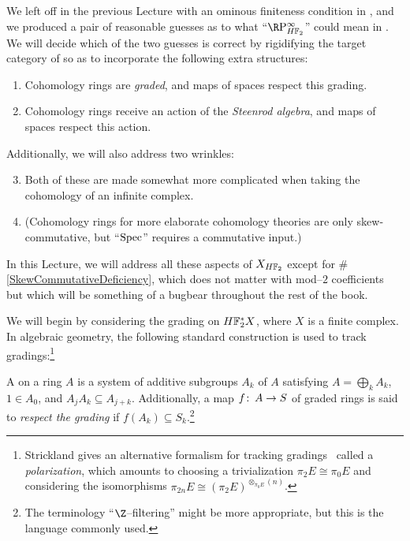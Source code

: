 We left off in the previous Lecture with an ominous finiteness condition in , and we produced a pair of reasonable guesses as to what ``\(\RP^\infty_{\HFtwo}\)'' could mean in .  We will decide which of the two guesses is correct by rigidifying the target category of  so as to incorporate the following extra structures:
\begin{enumerate}
\item Cohomology rings are \emph{graded}, and maps of spaces respect this grading.
\item Cohomology rings receive an action of the \emph{Steenrod algebra}, and maps of spaces respect this action.
\end{enumerate}
Additionally, we will also address two wrinkles:
\begin{enumerate}
\setcounter{enumi}{2}
\item Both of these are made somewhat more complicated when taking the cohomology of an infinite complex.
\item \label{SkewCommutativeDeficiency} (Cohomology rings for more elaborate cohomology theories are only skew-commutative, but ``\(\operatorname{Spec}\)'' requires a commutative input.)
\end{enumerate}
In this Lecture, we will address all these aspects of \(X_{\HFtwo}\) except for \#\ref{SkewCommutativeDeficiency}, which does not matter with mod--\(2\) coefficients but which will be something of a bugbear throughout the rest of the book.

We will begin by considering the grading on \(\HFtwo^* X\), where \(X\) is a finite complex.  In algebraic geometry, the following standard construction is used to track gradings:\footnote{Strickland gives an alternative formalism for tracking gradings~\cite[Sections 11 and 14]{StricklandFPFP} called a \emph{polarization}, which amounts to choosing a trivialization \(\pi_2 E \cong \pi_0 E\) and considering the isomorphisms \(\pi_{2n} E \cong (\pi_2 E)^{\otimes_{\pi_0 E} (n)}\).}

\begin{definition}
A  on a ring \(A\) is a system of additive subgroups \(A_k\) of \(A\) satisfying \(A = \bigoplus_k A_k\), \(1 \in A_0\), and \(A_j A_k \subseteq A_{j+k}\).  Additionally, a map \(f\colon\thinspace A \to S\) of graded rings is said to \textit{respect the grading} if \(f(A_k) \subseteq S_k\).\footnote{The terminology ``\(\Z\)--filtering'' might be more appropriate, but this is the language commonly used.}
\end{definition}

